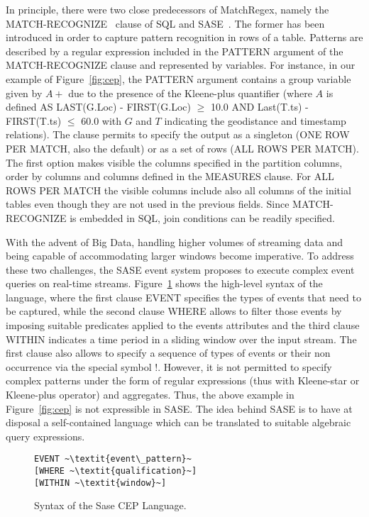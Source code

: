 In principle, there were two close predecessors of MatchRegex, namely the MATCH-RECOGNIZE~\cite{zemke_et_al_2007} clause of SQL and
SASE~\cite{WuDR06}. The former has been introduced in order to capture pattern recognition in rows of a table. Patterns are described by a regular
expression included in the PATTERN argument of the MATCH-RECOGNIZE clause and represented by variables. For instance, in our example of Figure~\ref{fig:cep}, the PATTERN argument contains a group variable given by $A+$ due to the presence of the Kleene-plus quantifier (where $A$ is defined AS
LAST(G.Loc) - FIRST(G.Loc) $\geq$ 10.0
        AND Last(T.ts) - FIRST(T.ts) $\leq$ 60.0 with $G$ and $T$ indicating the geodistance and timestamp relations). The clause permits to specify the output as a singleton (ONE ROW PER MATCH, also the default) or as a set of rows (ALL ROWS PER MATCH). The first option makes visible the columns specified in   the partition
columns, order by columns and columns defined in the MEASURES clause. For ALL
ROWS PER MATCH the visible columns include also all columns of the initial tables even though they are not used in the previous fields.
Since MATCH-RECOGNIZE is embedded in SQL, join conditions can be readily specified.

With the advent of Big Data, handling higher volumes of streaming data and being capable of accommodating larger windows become imperative. To address these two challenges, the SASE event system proposes to execute complex event queries on real-time streams.
Figure~\ref{fig:SASE} shows the high-level syntax of the language, where the first clause EVENT specifies the types of events that need to be captured, while the second clause WHERE allows to filter those events by imposing suitable predicates applied to the events attributes and the third clause WITHIN indicates a time period in a sliding window over the input stream.  The first clause also allows to specify a sequence of types of events or their non occurrence
via the special symbol $!$. However, it is not permitted to specify complex patterns under the form of regular expressions (thus with Kleene-star or Kleene-plus operator) and aggregates. Thus, the above example in Figure~\ref{fig:cep} is not expressible in SASE. The idea behind SASE is to have at disposal
a self-contained language which can be translated to suitable algebraic query expressions.

\begin{figure}[!h]
\begin{lstlisting}
EVENT ~\textit{event\_pattern}~
[WHERE ~\textit{qualification}~]
[WITHIN ~\textit{window}~]
\end{lstlisting}
\vspace*{-4mm}
\caption{\label{fig:SASE}Syntax of the Sase CEP Language.}
\end{figure}
